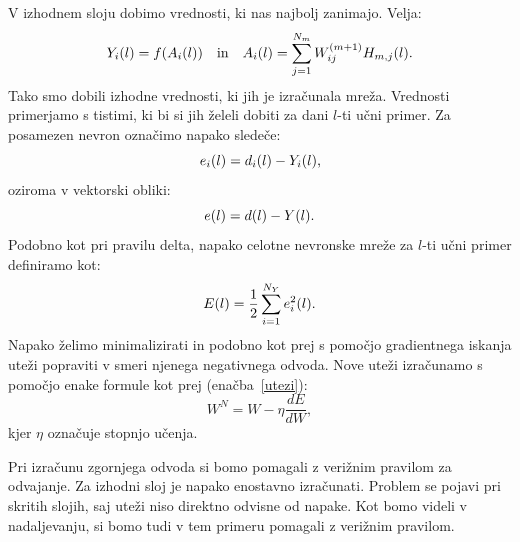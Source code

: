 \documentclass[mat1]{fmfdelo}
\begin{document}
 V izhodnem sloju dobimo vrednosti, ki nas najbolj zanimajo. Velja:
%
\begin{equation*}
Y_{i}(l) = f(A_{i}(l)) \quad \text{in} \quad A_{i}(l) = \sum^{N_{m}}_{j=1}{W^{(m+1)}_{ij}H_{m,j}(l)}\text.
\end{equation*}
%
Tako smo dobili izhodne vrednosti, ki jih je izračunala mreža. Vrednosti primerjamo s tistimi, ki bi si jih želeli dobiti za dani $l$-ti učni primer. Za posamezen nevron označimo napako sledeče:
%
\begin{equation}
e_i(l) = d_i(l) - Y_i(l)\text,
\end{equation}
oziroma v vektorski obliki:
\begin{equation*}
e(l) = d(l) - Y(l)\text.
\end{equation*}
Podobno kot pri pravilu delta, napako celotne nevronske mreže za $l$-ti učni primer definiramo kot:
%
\begin{equation}
E(l) = \frac{1}{2}\sum^{N_Y}_{i=1}e_i^2(l)\text.
\label{napaka}
\end{equation}
%
Napako želimo minimalizirati in podobno kot prej s pomočjo gradientnega iskanja uteži popraviti v smeri njenega negativnega odvoda. Nove uteži izračunamo s pomočjo enake formule kot prej (enačba~\eqref{utezi}):
\begin{equation*}
W^{N} = W - \eta \frac{dE}{dW}, 
\end{equation*}
%
kjer $\eta$ označuje stopnjo učenja. 

Pri izračunu zgornjega odvoda si bomo pomagali z verižnim pravilom za odvajanje. Za izhodni sloj je napako enostavno izračunati. Problem se pojavi pri skritih slojih, saj uteži niso direktno odvisne od napake. Kot bomo videli v nadaljevanju, si bomo tudi v tem primeru pomagali z verižnim pravilom. 
\end{document}

